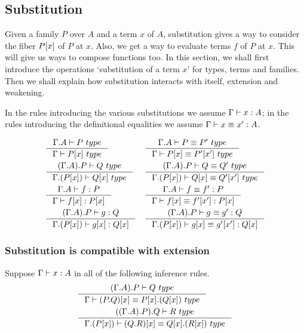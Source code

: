 \subsection{Substitution}
Given a family $P$ over $A$ and a term $x$ of $A$, substitution gives a way to
consider the fiber $\subst{x}{P}$ of $P$ at $x$. Also, we get a way to evaluate
terms $f$ of $P$ at $x$. This will give us ways to compose functions too. In
this section, we shall first introduce the operations `substitution of a term $x$'
for types, terms and families. Then we shall explain how substitution interacts
with itself, extension and weakening.

In the rules introducing the various substitutions we assume $\jterm{\Gamma}{A}{x}$;
in the rules introducing the definitional equalities we assume $\jtermeq{\Gamma}{A}{x}{x'}$.

\begin{align}
& \inference{\jtype{\ctxext{\Gamma}{A}}{P}}{\jtype{\Gamma}{\subst{x}{P}}}
& & \inference{\jtypeeq{\ctxext{\Gamma}{A}}{P}{P'}}{\jtypeeq{\Gamma}{\subst{x}{P}}{\subst{x'}{P'}}}\\
& \inference{\jtype{\ctxext{{\Gamma}{A}}{P}}{Q}}{\jtype{\ctxext{\Gamma}{\subst{x}{P}}}{\subst{x}{Q}}}
& & \inference{\jtypeeq{\ctxext{{\Gamma}{A}}{P}}{Q}{Q'}}{\jtypeeq{\ctxext{\Gamma}{\subst{x}{P}}}{\subst{x}{Q}}{\subst{x'}{Q'}}}\\
& \inference{\jterm{\ctxext{\Gamma}{A}}{P}{f}}{\jterm{\Gamma}{\subst{x}{P}}{\subst{x}{f}}}
& & \inference{\jtermeq{\ctxext{\Gamma}{A}}{P}{f}{f'}}{\jtermeq{\Gamma}{\subst{x}{P}}{\subst{x}{f}}{\subst{x'}{f'}}}\\
& \inference{\jterm{\ctxext{{\Gamma}{A}}{P}}{Q}{g}}{\jterm{\ctxext{\Gamma}{\subst{x}{P}}}{\subst{x}{Q}}{\subst{x}{g}}}
& &\inference{\jtermeq{\ctxext{{\Gamma}{A}}{P}}{Q}{g}{g'}}{\jtermeq{\ctxext{\Gamma}{\subst{x}{P}}}{\subst{x}{Q}}{\subst{x}{g}}{\subst{x'}{g'}}}
\end{align}

\subsubsection{Substitution is compatible with extension}
Suppose $\jterm{\Gamma}{A}{x}$ in all of the following inference rules.
\begin{align}
& \inference{\jtype{\ctxext{{\Gamma}{A}}{P}}{Q}}
  {\jtypeeq{\Gamma}{\subst{x}{\ctxext{P}{Q}}}{\ctxext{\subst{x}{P}}{\subst{x}{Q}}}}\\
& \inference{\jtype{\ctxext{{{\Gamma}{A}}{P}}{Q}}{R}}
  {\jtypeeq{\ctxext{\Gamma}{\subst{x}{P}}}{\subst{x}{\ctxext{Q}{R}}}{\ctxext{\subst{x}{Q}}{\subst{x}{R}}}}
\end{align}

